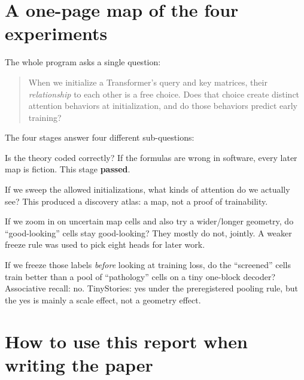 \documentclass[11pt,a4paper]{report}
\begin{document}
\section{A one-page map of the four experiments}

The whole program asks a single question:

\begin{quote}
When we initialize a Transformer's query and key matrices, their \emph{relationship} to each other is a free choice. Does that choice create distinct attention behaviors at initialization, and do those behaviors predict early training?
\end{quote}

The four stages answer four different sub-questions:
\begin{description}[style=nextline,leftmargin=2.4cm]
  \item[1A] Is the theory coded correctly? If the formulas are wrong in software, every later map is fiction. This stage \textbf{passed}.
  \item[1B] If we sweep the allowed initializations, what kinds of attention do we actually see? This produced a discovery atlas: a map, not a proof of trainability.
  \item[1C] If we zoom in on uncertain map cells and also try a wider/longer geometry, do ``good-looking'' cells stay good-looking? They mostly do not, jointly. A weaker freeze rule was used to pick eight heads for later work.
  \item[1D] If we freeze those labels \emph{before} looking at training loss, do the ``screened'' cells train better than a pool of ``pathology'' cells on a tiny one-block decoder? Associative recall: no. TinyStories: yes under the preregistered pooling rule, but the yes is mainly a scale effect, not a geometry effect.
\end{description}

\section{How to use this report when writing the paper}
\end{document}

